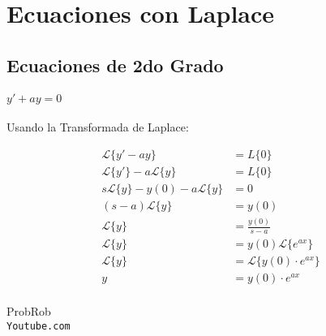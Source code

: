 \documentclass[12pt]{report}                                %
\begin{document}
\chapter{Ecuaciones con Laplace}


    \clearpage
    \section{Ecuaciones de 2do Grado}

        \subsubsection{$y'+ay=0$}
            Usando la Transformada de Laplace:

            \begin{equation*}   
            \begin{split}
                \mathscr{L}\{ y'-ay \} &= L\{0\}                            \\
                \mathscr{L}\{y'\}-a\mathscr{L}\{y\} &= L\{0\}               \\
                s\mathscr{L}\{y\}-y(0)-a\mathscr{L}\{y\} &= 0               \\
                (s-a)\mathscr{L}\{y\} &= y(0)                               \\
                \mathscr{L}\{y\} &= \frac{y(0)}{s-a}                        \\
                \mathscr{L}\{y\} &= y(0) \mathscr{L}\{e^{ax}\}              \\
                \mathscr{L}\{y\} &= \mathscr{L}\{y(0) \cdot e^{ax}\}        \\
                y &= y(0) \cdot e^{ax}                                      \\
            \end{split}
            \end{equation*}




\clearpage

	\begin{thebibliography}{9}

		ProbRob
		\\\texttt{Youtube.com}


	 

\end{thebibliography}
\end{document}
